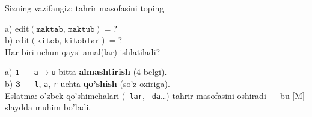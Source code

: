 \documentclass[aspectratio=169,11pt]{beamer}
\begin{document}
\begin{frame}{Sizning vazifangiz: tahrir masofasini toping}
  \begin{tcolorbox}[warnbox,title=Savol --- 2 daqiqa]
    \small
    a) $\text{edit}(\texttt{maktab},\, \texttt{maktub}) = ?$\\[4pt]
    b) $\text{edit}(\texttt{kitob},\, \texttt{kitoblar}) = ?$\\[4pt]
    \footnotesize Har biri uchun qaysi amal(lar) ishlatiladi?
  \end{tcolorbox}
  \pause
  \begin{tcolorbox}[okbox,title=Javob]
    \small
    a) $\mathbf{1}$ --- \texttt{a}$\to$\texttt{u} bitta \textbf{almashtirish}
    (4-belgi).\\[3pt]
    b) $\mathbf{3}$ --- \texttt{l}, \texttt{a}, \texttt{r} uchta
    \textbf{qo'shish} (so'z oxiriga).\\[3pt]
    \footnotesize Eslatma: o'zbek qo'shimchalari (\texttt{-lar}, \texttt{-da}\ldots)
    tahrir masofasini oshiradi --- bu [M]-slaydda muhim bo'ladi.
  \end{tcolorbox}
\end{frame}
\end{document}
